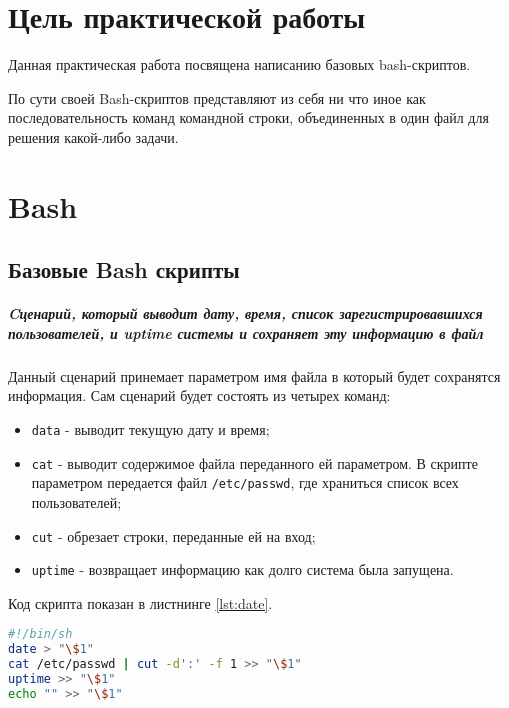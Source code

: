 \graphicspath{{~/Documents/SADT/SecondTask/img/}}
\chapter*{\LARGE{Цель практической работы}}
Данная практическая работа посвящена написанию базовых bash-скриптов.

По сути своей Bash-скриптов представляют из себя ни что иное как
последовательность команд командной строки, объединенных в один файл
для решения какой-либо задачи.

\chapter{Bash}
\section{Базовые Bash скрипты}
\paragraph{Cценарий, который выводит дату, время, список
зарегистрировавшихся пользователей, и uptime системы и сохраняет
эту информацию в файл}\mbox{}\par
Данный сценарий принемает параметром имя файла в который будет сохранятся
информация. Сам сценарий будет состоять из четырех команд:
\begin{itemize}
	\item \texttt{data} - выводит текущую дату и время;
	\item \texttt{cat} - выводит содержимое файла переданного ей параметром.
		В скрипте параметром передается файл \texttt{/etc/passwd},
		где храниться список всех пользователей;
	\item \texttt{cut} - обрезает строки, переданные ей на вход;
	\item \texttt{uptime} - возвращает информацию как долго система
		была запущена.
\end{itemize}
Код скрипта показан в листнинге \ref{lst:date}.

\begin{lstlisting}[language=Bash
	, caption=\leftline{Код скрипта}
	, label=lst:date]
#!/bin/sh
date > "\$1"
cat /etc/passwd | cut -d':' -f 1 >> "\$1"
uptime >> "\$1"
echo "" >> "\$1"
\end{lstlisting}

